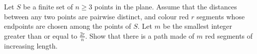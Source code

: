 Let $S$ be a finite set of $n \geq 3$ points in the plane. Assume that the distances between any two points are pairwise distinct, and colour red $r$ segments whose endpoints are chosen among the points of $S$. Let $m$ be the smallest integer greater than or equal to $\frac{2r}{n}$. Show that there is a path made of $m$ red segments of increasing length.
